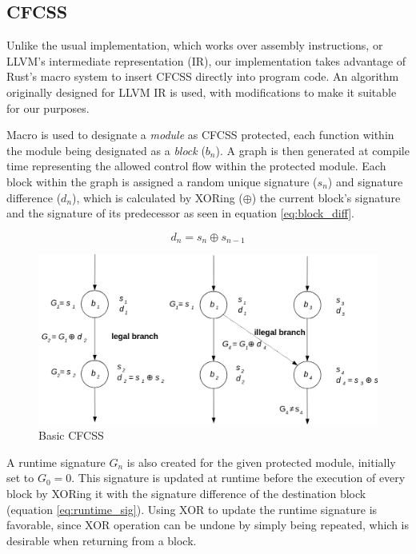 \subsection{CFCSS}

Unlike the usual implementation, which works over assembly instructions, or LLVM's intermediate representation (IR), our implementation takes advantage of Rust's macro system to insert CFCSS directly into program code. An algorithm originally designed for LLVM IR \cite{coast:cfcss} is used, with modifications to make it suitable for our purposes.

Macro is used to designate a \textit{module} as CFCSS protected, each function within the module being designated as a \textit{block} ({$b_n$}). A graph is then generated at compile time representing the allowed control flow within the protected module. Each block within the graph is assigned a random unique signature ({$s_n$}) and signature difference ({$d_n$}), which is calculated by XORing ({$\oplus$}) the current block's signature and the signature of its predecessor as seen in equation \ref{eq:block_diff}.

\begin{equation}
d_n = s_n \oplus s_{n-1}
\label{eq:block_diff}
\end{equation}

\begin{figure}[!h]
    \centering
    \includegraphics[width=1.0\textwidth]{diagrams/cfcss/basic.png}
    \caption{Basic CFCSS \cite{coast:cfcss}}
\end{figure}

A runtime signature {$G_n$} is also created for the given protected module, initially set to {$G_0 = 0$}. This signature is updated at runtime before the execution of every block by XORing it with the signature difference of the destination block (equation \ref{eq:runtime_sig}). Using XOR to update the runtime signature is favorable, since XOR operation can be undone by simply being repeated, which is desirable when returning from a block.

